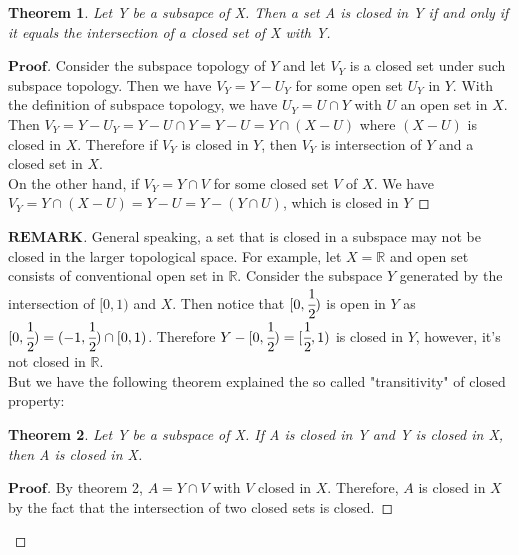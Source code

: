 \documentclass[a4paper, 11pt]{article}
\newtheorem{theorem}{Theorem}
\theoremstyle{remark}
\newenvironment{myremark}
{\renewcommand\qedsymbol{$ $}\begin{proof}[$\mathbf{REMARK}$]}
  {\end{proof}}
\newenvironment{myprf}
{\renewcommand\qedsymbol{$ $}\begin{proof}[$\mathbf{Proof}$]}
  {\end{proof}}
\theoremstyle{definition}
\begin{document}
\begin{theorem}
    Let Y be a subsapce of X. Then a set A is closed in Y if and only if it equals the intersection of a closed set of X with Y.        
\end{theorem}
\begin{myprf}
        Consider the subspace topology of $Y$ and let $V_{Y}$ is a closed set under such
        subspace topology. Then we have $V_{Y}=Y-U_{Y}$ for some open set
        $U_{Y}$ in $Y$. With the definition of subspace topology, we have 
        $U_{Y}=U\cap Y$ with $U$ an open set in $X$. Then $V_{Y}=Y-U_{Y}
        =Y-U\cap Y=Y-U=Y\cap (X-U)$ where $(X-U)$ is closed in $X$. Therefore 
        if $V_{Y}$ is closed in $Y$, then $V_{Y}$ is intersection of $Y$ and a 
        closed set in $X$. \\
        On the other hand, if $V_{Y}=Y\cap V$ for some closed 
        set $V$ of $X$. We have $V_{Y}=Y\cap (X-U)=Y-U=Y-(Y\cap U)$, which is 
        closed in $Y$
\end{myprf}
\begin{myremark}
        General speaking, a set that is closed in a subspace may not be closed in the larger 
        topological space. For example, let $X=\mathbb{R}$ and open set consists
        of conventional open set in $\mathbb{R}$. Consider the subspace $Y$ generated
        by the intersection of $[0,1)$ and $X$. Then notice that $[0,\cfrac{1}{2})$
        is open in $Y$ as $[0,\cfrac{1}{2})=(-1,\cfrac{1}{2})\cap [0,1)$. Therefore
        $Y-[0,\cfrac{1}{2})=[\cfrac{1}{2},1)$ is closed in $Y$, however, it's not
        closed in $\mathbb{R}$.\\
        But we have the following theorem explained the so called "transitivity"
        of closed property:
        \vspace{0.1cm}
        \begin{theorem}
               Let Y be a subspace of X. If A is closed in Y and Y is closed in X,
               then A is closed in X.
        \end{theorem}
        \begin{myprf}
               By theorem 2, $A=Y\cap V$ with $V$ closed in $X$. Therefore, $A$
               is closed in $X$ by the fact that the intersection of two closed 
               sets is closed.
        \end{myprf}
\end{myremark}
\end{document}
